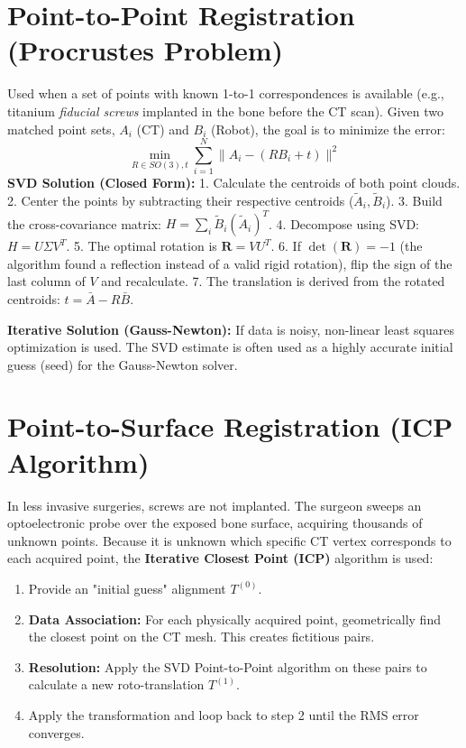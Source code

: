 \documentclass[11pt,a4paper,twoside]{report}
\begin{document}
\section{Point-to-Point Registration (Procrustes Problem)}
Used when a set of points with known 1-to-1 correspondences is available (e.g., titanium \textit{fiducial screws} implanted in the bone before the CT scan).
Given two matched point sets, $A_i$ (CT) and $B_i$ (Robot), the goal is to minimize the error:
\begin{equation}
    \min_{R \in SO(3), t} \sum_{i=1}^{N} \| A_i - (R B_i + t) \|^2
\end{equation}
\textbf{SVD Solution (Closed Form):} 
1. Calculate the centroids of both point clouds.
2. Center the points by subtracting their respective centroids ($\tilde{A}_i, \tilde{B}_i$).
3. Build the cross-covariance matrix: $H = \sum_{i} \tilde{B}_i (\tilde{A}_i)^T$.
4. Decompose using SVD: $H = U \Sigma V^T$.
5. The optimal rotation is $\mathbf{R} = V U^T$.
6. If $\det(\mathbf{R}) = -1$ (the algorithm found a reflection instead of a valid rigid rotation), flip the sign of the last column of $V$ and recalculate.
7. The translation is derived from the rotated centroids: $t = \bar{A} - R\bar{B}$.

\textbf{Iterative Solution (Gauss-Newton):} If data is noisy, non-linear least squares optimization is used. The SVD estimate is often used as a highly accurate initial guess (seed) for the Gauss-Newton solver.

\section{Point-to-Surface Registration (ICP Algorithm)}
In less invasive surgeries, screws are not implanted. The surgeon sweeps an optoelectronic probe over the exposed bone surface, acquiring thousands of unknown points. Because it is unknown which specific CT vertex corresponds to each acquired point, the \textbf{Iterative Closest Point (ICP)} algorithm is used:
\begin{enumerate}
    \item Provide an "initial guess" alignment $T^{(0)}$.
    \item \textbf{Data Association:} For each physically acquired point, geometrically find the closest point on the CT mesh. This creates fictitious pairs.
    \item \textbf{Resolution:} Apply the SVD Point-to-Point algorithm on these pairs to calculate a new roto-translation $T^{(1)}$.
    \item Apply the transformation and loop back to step 2 until the RMS error converges.
\end{enumerate}
\end{document}
